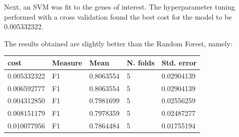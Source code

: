 \documentclass[journal]{IEEEtran}
\begin{document}
Next, an SVM was fit to the genes of interest. The hyperparameter tuning performed with a cross validation found the best cost for the model to be 0.005332322.

The results obtained are slightly better than the Random Forest, namely:
\begin{table}[!ht]
    \begin{threeparttable}
    \centering
        \begin{tabularx}{\linewidth}{ X | X | X | X | X }
            \hline
            \textbf{cost} &
            \textbf{Measure} &  \textbf{Mean} & \textbf{N. folds} & \textbf{Std. error} \\ \hline
            0.005332322 & F1 & 0.8063554 & 5 & 0.02904139 \\
            0.006592777 & F1 & 0.8063554 & 5 & 0.02904139 \\
            0.004312850 & F1 & 0.7981699 & 5 & 0.02556259 \\
            0.008151179 & F1 & 0.7978359 & 5 & 0.02487277 \\
            0.010077956 & F1 & 0.7864484 & 5 & 0.01755194 \\
        \end{tabularx}
     \end{threeparttable}
\end{table}
\end{document}
